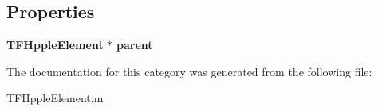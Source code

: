 \subsection*{Properties}
\begin{DoxyCompactItemize}
\item 
{\bf T\+F\+Hpple\+Element} $\ast$ {\bfseries parent}\label{category_t_f_hpple_element_07_08_a3a570a7692ac21f8d4adc52b4c96756c}

\end{DoxyCompactItemize}


The documentation for this category was generated from the following file\+:\begin{DoxyCompactItemize}
\item 
T\+F\+Hpple\+Element.\+m\end{DoxyCompactItemize}
